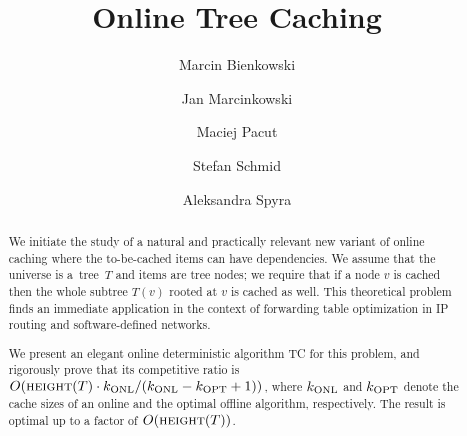 \documentclass[sigconf,screen=true]{acmart}
\newcommand{\ALG}{\textsc{TC}\xspace}
\newcommand{\kALG}{k_\textnormal{ONL}}
\newcommand{\kOPT}{k_\textnormal{OPT}}
\begin{document}
\title{Online Tree Caching}


\author{Marcin Bienkowski} 
\author{Jan Marcinkowski}
\author{Maciej Pacut}
\author{Stefan Schmid}
\author{Aleksandra Spyra}




\begin{abstract}
We initiate the study of a natural and practically relevant new variant of
online caching where the to-be-cached items can have
dependencies.  We assume that the universe is a~tree~$T$ and items are tree
nodes; we require that if a node $v$ is cached then the whole subtree $T(v)$
rooted at $v$ is cached as well. This theoretical problem finds an immediate
application in the context of forwarding table optimization in IP routing and
software-defined networks.

We present an elegant online deterministic algorithm \ALG for this problem, and 
rigorously prove that its competitive ratio is 
$O(\textsc{height}(T) \cdot \kALG/(\kALG-\kOPT+1))$, where $\kALG$ and $\kOPT$
denote the cache sizes of an online and the optimal offline algorithm,
respectively. The result is optimal up to a factor of $O(\textsc{height}(T))$.
\end{abstract}

\maketitle
\end{document}

